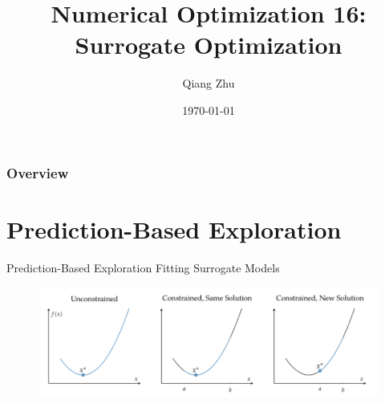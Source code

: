 \documentclass{beamer}
\title[Surrogate Optimization]{Numerical Optimization 16: Surrogate Optimization} %
\author{Qiang Zhu} %
\institute[University of Nevada Las Vegas] %
{
University of Nevada Las Vegas\\ %
\medskip
}
\date{\today} %
\begin{document}
\begin{frame}
\titlepage %
\end{frame}

\begin{frame}
\frametitle{Overview} %
\tableofcontents %
\end{frame}



\section{Prediction-Based Exploration}
\begin{frame}{Prediction-Based Exploration}
Fitting Surrogate Models
\begin{figure}
\centering
\includegraphics[width=120mm]{Figs/constraint-ab.jpeg}
\end{figure}   

\end{frame}
\end{document}
